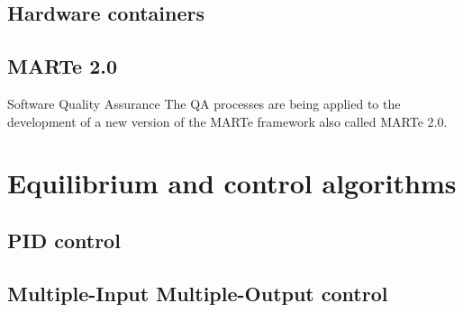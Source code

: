 \subsection{Hardware containers}

\subsection{MARTe 2.0}
Software Quality Assurance The QA processes are being applied to the development of a
new version of the MARTe framework also  called MARTe 2.0. 
\cite{MARTe2}

\section{Equilibrium and control algorithms} 
\subsection{PID control}
\subsection{Multiple-Input Multiple-Output control}